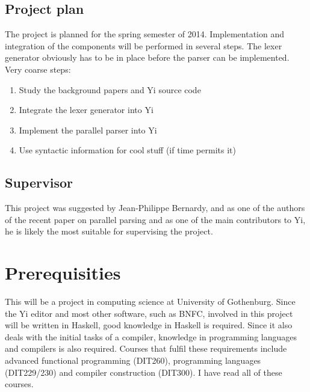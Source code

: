 \documentclass[a4paper,12pt]{article}
\begin{document}
\subsection*{Project plan}
The project is planned for the spring semester of 2014.  Implementation and
integration of the components will be performed in several steps. The lexer
generator obviously has to be in place before the parser can be implemented.
Very coarse steps:
\begin{enumerate}
    \item{Study the background papers and Yi source code}
    \item{Integrate the lexer generator into Yi}
    \item{Implement the parallel parser into Yi}
    \item{Use syntactic information for cool stuff (if time permits it)}
\end{enumerate}

\subsection*{Supervisor}
This project was suggested by Jean-Philippe Bernardy, and as one of the authors
of the recent paper on parallel parsing and as one of the main contributors to
Yi, he is likely the most suitable for supervising the project.

\section*{Prerequisities}
This will be a project in computing science at University of Gothenburg. Since
the Yi editor and most other software, such as BNFC\cite{bnfc}, involved in this
project will be written in Haskell, good knowledge in Haskell is required. Since
it also deals with the initial tasks of a compiler, knowledge in programming
languages and compilers is also required. Courses that fulfil these requirements
include advanced functional programming (DIT260), programming languages
(DIT229/230) and compiler construction (DIT300). I have read all of these
courses.
\end{document}
